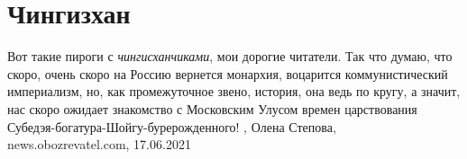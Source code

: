  
 
 
 
 
\chapter{Чингизхан}

Вот такие пироги с \emph{чингисханчиками}, мои дорогие читатели. Так что думаю,
что скоро, очень скоро на Россию вернется монархия, воцарится коммунистический
империализм, но, как промежуточное звено, история, она ведь по кругу, а значит,
нас скоро ожидает знакомство с Московским Улусом времен царствования
Субедэя-богатура-Шойгу-бурерожденного!
, 
Олена Степова, news.obozrevatel.com, 17.06.2021
